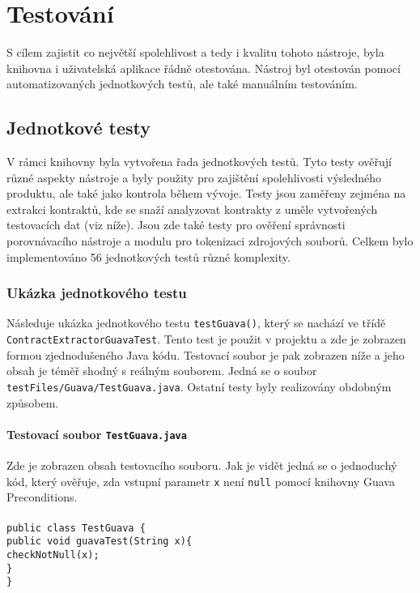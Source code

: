\chapter{Testování}
	S cílem zajistit co největší spolehlivost a tedy i kvalitu tohoto nástroje, byla knihovna i uživatelská aplikace řádně otestována. Nástroj byl otestován pomocí automatizovaných jednotkových testů, ale také manuálním testováním.
	
	\section{Jednotkové testy}
		V rámci knihovny byla vytvořena řada jednotkových testů. Tyto testy ověřují různé aspekty nástroje a byly použity pro zajištění spolehlivosti výsledného produktu, ale také jako kontrola během vývoje. Testy jsou zaměřeny zejména na extrakci kontraktů, kde se snaží analyzovat kontrakty z uměle vytvořených testovacích dat (viz níže). Jsou zde také testy pro ověření správnosti porovnávacího nástroje a modulu pro tokenizaci zdrojových souborů. Celkem bylo implementováno 56 jednotkových testů různé komplexity.
		
		\subsection{Ukázka jednotkového testu}
			Následuje ukázka jednotkového testu \texttt{testGuava()}, který se nachází ve třídě \texttt{ContractExtractorGuavaTest}. Tento test je použit v projektu a zde je zobrazen formou zjednodušeného Java kódu. Testovací soubor je pak zobrazen níže a jeho obsah je téměř shodný s reálným souborem. Jedná se o soubor \texttt{testFiles/Guava/TestGuava.java}. Ostatní testy byly realizovány obdobným způsobem.
			
			\subsubsection{Testovací soubor \texttt{TestGuava.java}}
				Zde je zobrazen obsah testovacího souboru. Jak je vidět jedná se o jednoduchý kód, který ověřuje, zda vstupní parametr \texttt{x} není \texttt{null} pomocí knihovny Guava Preconditions.\\\\	
				\- \- \- \- \- \- \texttt{public class TestGuava \{}\\
				\- \- \- \- \- \- \- \- \- \texttt{public void guavaTest(String x)\{}\\
    			\- \- \- \- \- \- \- \- \- \- \- \- \texttt{checkNotNull(x);}\\
				\- \- \- \- \- \- \- \- \- \texttt{\}}\\
				\- \- \- \- \- \- \texttt{\}}        	
			
